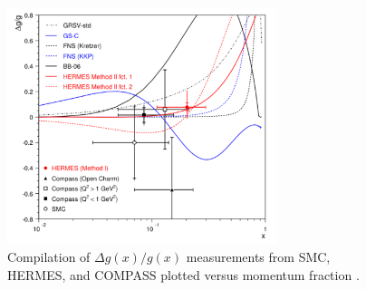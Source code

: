 \begin{figure}
  \centering
  \includegraphics[width=0.7\textwidth]{figures/dgg-hermes-final}
  \caption{Compilation of $\Delta g(x)/g(x)$ measurements from SMC, HERMES,
  and COMPASS plotted versus momentum fraction \cite{Hasch:2009zza}.}
  \label{fig:pgf-deltag}
\end{figure}


